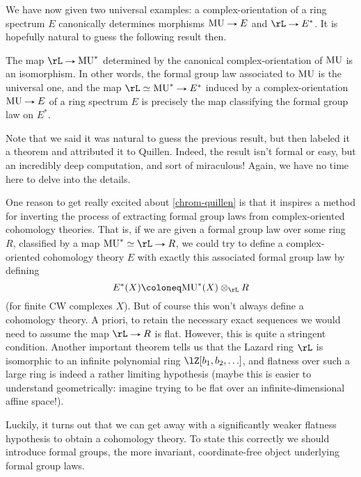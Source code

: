 We have now given two universal examples: a complex-orientation of a
ring spectrum $E$ canonically determines morphisms $\MU \to E$ and
$\rL \to E^*$. It is hopefully natural to guess the following result
then.

\begin{theorem}[Quillen]
  \label{chrom-quillen}
  The map $\rL \to \MU^*$ determined by the canonical
  complex-orientation of $\mathrm{MU}$ is an isomorphism. In other words, the
  formal group law associated to $\mathrm{MU}$ is the universal one, and the
  map $\rL \iso \MU^* \to E^*$ induced by a complex-orientation
  $\MU \to E$ of a ring spectrum $E$ is precisely the map classifying
  the formal group law on $E^*$.
\end{theorem}

\begin{remark}
  \label{chrom-quillenhard}
  Note that we said it was natural to guess the previous result, but
  then labeled it a theorem and attributed it to Quillen. Indeed, the
  result isn't formal or easy, but an incredibly deep computation, and
  sort of miraculous!  Again, we have no time here to delve into the
  details.
\end{remark}

One reason to get really excited about \cref{chrom-quillen} is that it
inspires a method for inverting the process of extracting formal group
laws from complex-oriented cohomology theories. That is, if we are
given a formal group law over some ring $R$, classified by a map
$\MU^* \iso \rL \to R$, we could try to define a complex-oriented
cohomology theory $E$ with exactly this associated formal group law by
defining
\[
E^*(X) \ce \MU^*(X) \otimes_\rL R
\]
(for finite CW complexes $X$). But of course this won't always define
a cohomology theory. A priori, to retain the necessary exact sequences
we would need to assume the map $\rL \to R$ is flat. However, this is
quite a stringent condition. Another important theorem tells us that
the Lazard ring $\rL$ is isomorphic to an infinite polynomial ring
$\lZ[b_1,b_2,\ldots]$, and flatness over such a large ring is indeed a
rather limiting hypothesis (maybe this is easier to understand
geometrically: imagine trying to be flat over an infinite-dimensional
affine space!).

Luckily, it turns out that we can get away with a significantly weaker
flatness hypothesis to obtain a cohomology theory. To state this
correctly we should introduce formal groups, the more invariant,
coordinate-free object underlying formal group laws.

